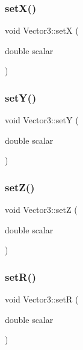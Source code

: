 \mbox{\label{class_vector3_add0f1fd39742bfcc74a0d9fe620e0178}} 
\subsubsection{\texorpdfstring{setX()}{setX()}}
{\footnotesize\ttfamily void Vector3\+::setX (\begin{DoxyParamCaption}\item[{double}]{scalar }\end{DoxyParamCaption})}

\mbox{\label{class_vector3_a3197fa0880adc862a01f9bf29dd83e10}} 
\subsubsection{\texorpdfstring{setY()}{setY()}}
{\footnotesize\ttfamily void Vector3\+::setY (\begin{DoxyParamCaption}\item[{double}]{scalar }\end{DoxyParamCaption})}

\mbox{\label{class_vector3_a4404619e2da9f0717c2d1b68fa4830f2}} 
\subsubsection{\texorpdfstring{setZ()}{setZ()}}
{\footnotesize\ttfamily void Vector3\+::setZ (\begin{DoxyParamCaption}\item[{double}]{scalar }\end{DoxyParamCaption})}

\mbox{\label{class_vector3_a9beef32ceaebce5bd595fd016e65be4f}} 
\subsubsection{\texorpdfstring{setR()}{setR()}}
{\footnotesize\ttfamily void Vector3\+::setR (\begin{DoxyParamCaption}\item[{double}]{scalar }\end{DoxyParamCaption})}

